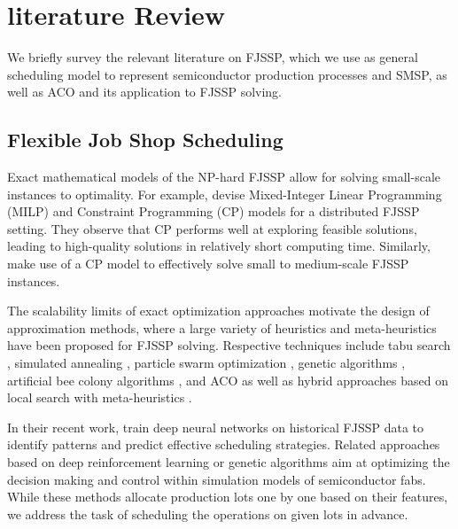 \documentclass[runningheads]{llncs}
\begin{document}
\section{literature Review}
\label{sec:lit_rev}



We briefly survey the relevant literature on FJSSP, which we use as general
scheduling model to represent semiconductor production processes and SMSP,
as well as ACO and its application to FJSSP solving.

\subsection{Flexible Job Shop Scheduling} %

\label{sec:fjssp}

Exact mathematical models of the NP-hard FJSSP allow for solving small-scale instances to optimality. For example, \cite{meng2020mixed} devise Mixed-Integer Linear Programming (MILP) and Constraint Programming (CP) models for a distributed FJSSP setting. 
They observe that CP performs well at exploring feasible solutions,
leading to high-quality solutions in relatively short computing time.
Similarly, \cite{gedik2018constraint} make use of a CP model to effectively solve small to medium-scale FJSSP instances.

The scalability limits of exact optimization approaches motivate the design
of approximation methods, where a large variety of heuristics and meta-heuristics have been proposed for FJSSP solving.
Respective techniques include
tabu search \cite{saidi2007flexible},
simulated annealing \cite{sobeyko2016heuristic},
particle swarm optimization \cite{gao2006solving},
genetic algorithms \cite{ho2007effective},
artificial bee colony algorithms \cite{li2014discrete}, and
ACO \cite{wang2017flexible} as well as
hybrid approaches based on local search with meta-heuristics \cite{li2010improved,xing2010knowledge,thammano2013hybrid,el2017dual}.

In their recent work, \cite{shang2023study} 
train deep neural networks on historical FJSSP data to identify patterns and predict effective scheduling strategies.
Related approaches based on deep reinforcement learning \cite{stockermann2023dispatching,tassel2023semiconductor} or
genetic algorithms \cite{kovacs2023optimizing} aim at
optimizing the decision making and control within simulation models of semiconductor fabs.
While these methods allocate production lots one by one based on their features,
we address the task of scheduling the operations on given lots in advance.
\end{document}
